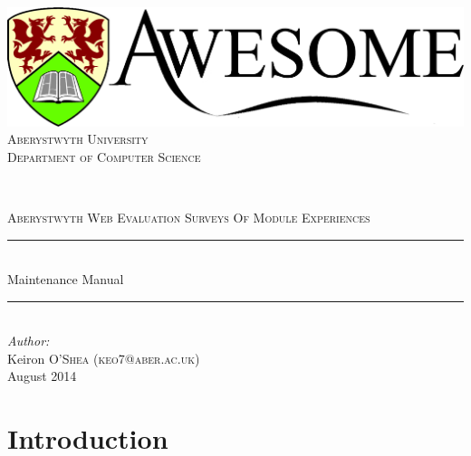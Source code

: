 \documentclass[11pt,a4paper]{article}
\begin{document}

\begin{titlepage}

\newcommand{\HRule}{\rule{\linewidth}{0.5mm}} %

\center %

\includegraphics[scale=0.15]{images/Aberblack.png} \\[1.5cm] %
\textsc{\large Aberystwyth University
 \\[0.5cm] Department of Computer Science}

\

\textsc{\Large Aberystwyth Web Evaluation Surveys Of Module Experiences}\\
\HRule \\[0.4cm]
{ \huge  Maintenance Manual}\\[0.4cm] %
\HRule \\[1.5cm]

\Large \emph{Author:}\\
Keiron \textsc{O'Shea (keo7@aber.ac.uk)}\\[1cm] %

{\large August 2014}\\[2cm] %

\vfill %

\end{titlepage}

\thispagestyle{plain}	

\tableofcontents

\clearpage


\clearpage

\section{Introduction}
\end{document}
